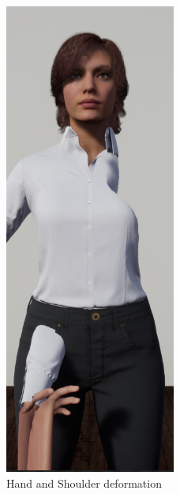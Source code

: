 \begin{table}[!htb]
    \begin{minipage}{\linewidth}
        \centering
        \begin{subfigure}{0.49\textwidth}
            \centering
            \includegraphics[width=0.5\textwidth]{figures/issue.png}
            \caption{Hand and Shoulder deformation}
        \end{subfigure}
        \begin{subfigure}{0.49\textwidth}

\end{subfigure}
\end{minipage}
\end{table}
